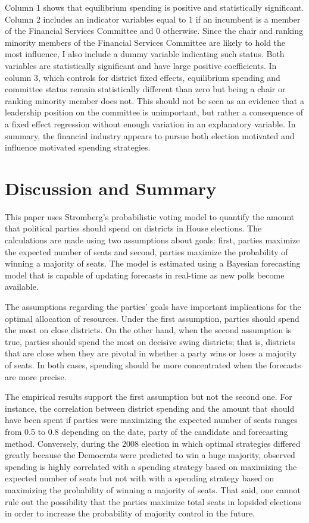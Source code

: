 \documentclass[12pt,final,fleqn]{article}
\theoremstyle{plain}
\begin{document}
Column 1 shows that equilibrium spending is positive and statistically significant. Column 2 includes an indicator variables equal to 1 if an incumbent is a member of the Financial Services Committee and 0 otherwise. Since the chair and ranking minority members of the Financial Services Committee are likely to hold the most influence, I also include a dummy variable indicating such status. Both variables are statistically significant and have large positive coefficients. In column 3, which controls for district fixed effects, equilibrium spending and committee status remain statistically different than zero but being a chair or ranking minority member does not. This should not be seen as an evidence that a leadership position on the committee is unimportant, but rather a consequence of a fixed effect regression without enough variation in an explanatory variable. In summary, the financial industry appears to pursue both election motivated and influence motivated spending strategies.

\section{Discussion and Summary}
This paper uses Stromberg's \citeyear{stromberg2008electoral} probabilistic voting model to quantify the amount that political parties should spend on districts in House elections. The calculations are made using two assumptions about goals: first, parties maximize the expected number of seats and second, parties maximize the probability of winning a majority of seats. The model is estimated using a Bayesian forecasting model that is capable of updating forecasts in real-time as new polls become available.

The assumptions regarding the parties' goals have important implications for the optimal allocation of resources. Under the first assumption, parties should spend the most on close districts. On the other hand, when the second assumption is true, parties should spend the most on decisive swing districts; that is, districts that are close when they are pivotal in whether a party wins or loses a majority of seats. In both cases, spending should be more concentrated when the forecasts are more precise. 

The empirical results support the first assumption but not the second one. For instance, the correlation between district spending and the amount that should have been spent if parties were maximizing the expected number of seats ranges from 0.5 to 0.8 depending on the date, party of the candidate and forecasting method. Conversely, during the 2008 election in which optimal strategies differed greatly because the Democrats were predicted to win a huge majority, observed spending is highly correlated with a spending strategy based on maximizing the expected number of seats but not with with a spending strategy based on maximizing the probability of winning a majority of seats. That said, one cannot rule out the possibility that the parties maximize total seats in lopsided elections in order to increase the probability of majority control in the future. 
\end{document}
